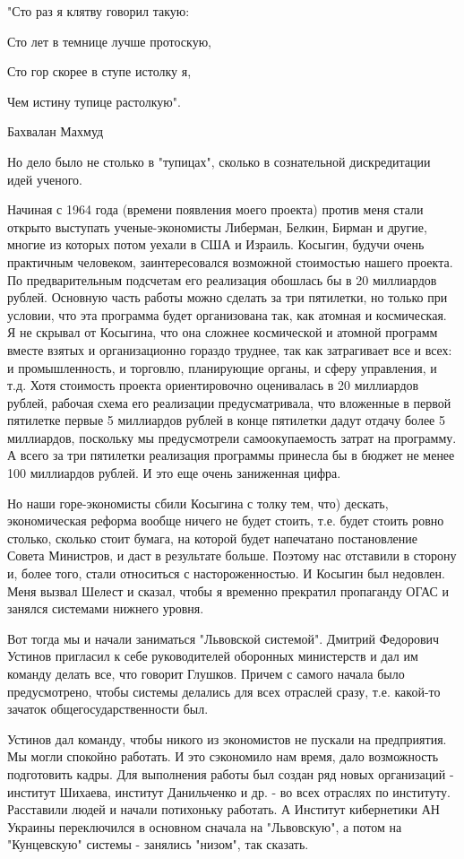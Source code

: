 \documentclass{article}
\begin{document}
\bigskip
"Сто раз я клятву говорил такую:

Сто лет в темнице лучше протоскую,

Сто гор скорее в ступе истолку я,

Чем истину тупице растолкую".

Бахвалан Махмуд
\bigskip

Но дело было не столько в "тупицах", сколько в сознательной дискредитации идей
ученого.

Начиная с 1964 года (времени появления моего проекта) против меня стали открыто
выступать ученые-экономисты Либерман, Белкин, Бирман и другие, многие из которых
потом уехали в США и Израиль. Косыгин, будучи очень практичным человеком,
заинтересовался возможной стоимостью нашего проекта. По предварительным
подсчетам его реализация обошлась бы в 20 миллиардов рублей. Основную часть
работы можно сделать за три пятилетки, но только при условии, что эта программа
будет организована так, как атомная и космическая. Я не скрывал от Косыгина, что
она сложнее космической и атомной программ вместе взятых и организационно
гораздо труднее, так как затрагивает все и всех: и промышленность, и торговлю,
планирующие органы, и сферу управления, и т.д. Хотя стоимость проекта
ориентировочно оценивалась в 20 миллиардов рублей, рабочая схема его реализации
предусматривала, что вложенные в первой пятилетке первые 5 миллиардов рублей в
конце пятилетки дадут отдачу более 5 миллиардов, поскольку мы предусмотрели
самоокупаемость затрат на программу. А всего за три пятилетки реализация
программы принесла бы в бюджет не менее 100 миллиардов рублей. И это еще очень
заниженная цифра.

Но наши горе-экономисты сбили Косыгина с толку тем, что) дескать, экономическая
реформа вообще ничего не будет стоить, т.е. будет стоить ровно столько, сколько
стоит бумага, на которой будет напечатано постановление Совета Министров, и даст
в результате больше. Поэтому нас отставили в сторону и, более того, стали
относиться с настороженностью. И Косыгин был недовлен. Меня вызвал Шелест и
сказал, чтобы я временно прекратил пропаганду ОГАС и занялся системами нижнего
уровня.

Вот тогда мы и начали заниматься "Львовской системой". Дмитрий Федорович Устинов
пригласил к себе руководителей оборонных министерств и дал им команду делать
все, что говорит Глушков. Причем с самого начала было предусмотрено, чтобы
системы делались для всех отраслей сразу, т.е. какой-то зачаток
общегосударственности был.

Устинов дал команду, чтобы никого из экономистов не пускали на предприятия. Мы
могли спокойно работать. И это сэкономило нам время, дало возможность
подготовить кадры. Для выполнения работы был создан ряд новых организаций -
институт Шихаева, институт Данильченко и др. - во всех отраслях по институту.
Расставили людей и начали потихоньку работать. А Институт кибернетики АН Украины
переключился в основном сначала на "Львовскую", а потом на "Кунцевскую" системы
- занялись "низом", так сказать.
\end{document}

